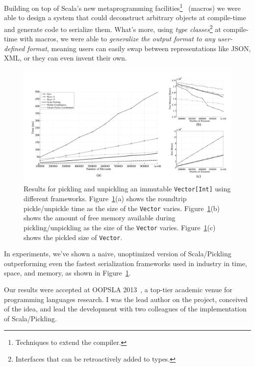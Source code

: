 \documentclass[acmtocl]{acmtrans2m}
\begin{document}
Building on top of Scala's new metaprogramming facilities\footnote{Techniques
to extend the compiler.}~\cite{ScalaMacros} (macros) we were able to design a
system that could deconstruct arbitrary objects at compile-time and generate
code to serialize them. What's more, using \textit{type
classes}\footnote{Interfaces that can be retroactively added to types.} at
compile-time with macros, we were able to \textit{generalize the output format
to any user-defined format}, meaning users can easily swap between
representations like JSON, XML, or they can even invent their own.

\begin{figure}[t!]
 \centering
 \includegraphics[width=\textwidth]{travInt-all.pdf}
 \caption{\footnotesize Results for pickling and unpickling an immutable
   \texttt{Vector[Int]} using different frameworks. Figure~\ref{fig:results-vector}(a) shows the roundtrip pickle/unpickle time as the size of the \texttt{Vector} varies. Figure~\ref{fig:results-vector}(b) shows the amount of free memory available during pickling/unpickling as the size of the \texttt{Vector} varies. Figure~\ref{fig:results-vector}(c) shows the pickled size of \texttt{Vector}.}
 \label{fig:results-vector}
\end{figure}

In experiments, we've shown a naive, unoptimized version of Scala/Pickling
outperforming even the fastest serialization frameworks used in industry in
time, space, and memory, as shown in Figure~\ref{fig:results-vector}.

Our results were accepted at OOPSLA 2013~\cite{Pickling}, a top-tier academic
venue for programming languages research. I was the lead author on the
project, conceived of the idea, and lead the development with two colleagues
of the implementation of Scala/Pickling.
\end{document}
